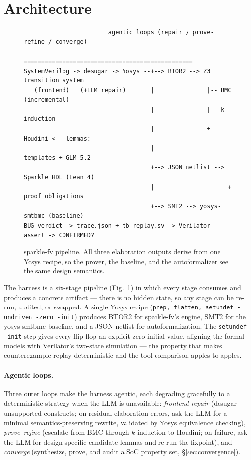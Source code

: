 \documentclass[11pt]{article}
\newcommand{\sfv}{\textsf{sparkle-fv}}
\newcommand{\tool}[1]{\textsf{#1}}
\begin{document}
\section{Architecture}\label{sec:arch}

\begin{figure}[h]
\begin{lstlisting}
                        agentic loops (repair / prove-refine / converge)
                        ================================================
SystemVerilog -> desugar -> Yosys --+--> BTOR2 --> Z3 transition system
   (frontend)   (+LLM repair)       |               |-- BMC (incremental)
                                    |               |-- k-induction
                                    |               +-- Houdini <-- lemmas:
                                    |                     templates + GLM-5.2
                                    +--> JSON netlist --> Sparkle HDL (Lean 4)
                                    |                     + proof obligations
                                    +--> SMT2 --> yosys-smtbmc (baseline)
BUG verdict -> trace.json + tb_replay.sv -> Verilator --assert -> CONFIRMED?
\end{lstlisting}
\caption{\sfv{} pipeline. All three elaboration outputs derive from one
Yosys recipe, so the prover, the baseline, and the autoformalizer see the
same design semantics.}
\label{fig:arch}
\end{figure}

The harness is a six-stage pipeline (Fig.~\ref{fig:arch}) in which every
stage consumes and produces a concrete artifact --- there is no hidden state,
so any stage can be re-run, audited, or swapped. A single Yosys recipe
(\texttt{prep; flatten; setundef -undriven -zero -init}) produces BTOR2 for
\sfv{}'s engine, SMT2 for the \tool{yosys-smtbmc} baseline, and a JSON
netlist for autoformalization. The \texttt{setundef -init} step gives every
flip-flop an explicit zero initial value, aligning the formal models with
Verilator's two-state simulation --- the property that makes counterexample
replay deterministic and the tool comparison apples-to-apples.

\paragraph{Agentic loops.} Three outer loops make the harness agentic, each
degrading gracefully to a deterministic strategy when the LLM is
unavailable: \emph{frontend repair} (desugar unsupported constructs; on
residual elaboration errors, ask the LLM for a minimal semantics-preserving
rewrite, validated by Yosys equivalence checking), \emph{prove--refine}
(escalate from BMC through $k$-induction to Houdini; on failure, ask the LLM
for design-specific candidate lemmas and re-run the fixpoint), and
\emph{converge} (synthesize, prove, and audit a SoC property set,
\S\ref{sec:convergence}).
\end{document}

